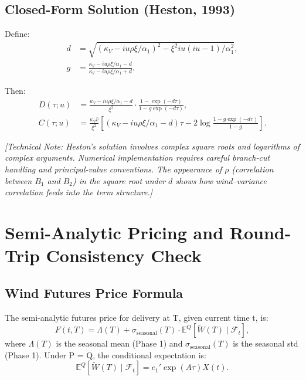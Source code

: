 \documentclass[11pt, a4paper, twoside]{article}
\begin{document}
\subsection{Closed-Form Solution (Heston, 1993)}

Define:
\begin{align}
d &= \sqrt{(\kappa_V - i u \rho \xi / \alpha_1)^2 - \xi^2 i u (i u - 1) / \alpha_1^2}, \\
g &= \frac{\kappa_V - i u \rho \xi / \alpha_1 - d}{\kappa_V - i u \rho \xi / \alpha_1 + d}.
\end{align}

Then:
\begin{align}
D(\tau; u) &= \frac{\kappa_V - i u \rho \xi / \alpha_1 - d}{\xi^2} \cdot \frac{1 - \exp(-d \tau)}{1 - g \exp(-d \tau)}, \\
C(\tau; u) &= \frac{\kappa_V \bar{v}}{\xi^2} \left[ (\kappa_V - i u \rho \xi / \alpha_1 - d) \tau - 2 \log \frac{1 - g \exp(-d \tau)}{1 - g} \right].
\end{align}

\textit{[Technical Note: Heston's solution involves complex square roots and logarithms of complex arguments. Numerical implementation requires careful branch-cut handling and principal-value conventions. The appearance of $\rho$ (correlation between $B_1$ and $B_2$) in the square root under $d$ shows how wind--variance correlation feeds into the term structure.]}

\section{Semi-Analytic Pricing and Round-Trip Consistency Check}

\subsection{Wind Futures Price Formula}

The semi-analytic futures price for delivery at T, given current time t, is:
\begin{equation}
F(t, T) = \Lambda(T) + \sigma_{\text{seasonal}}(T) \cdot \mathbb{E}^Q[\tilde{W}(T) \mid \mathcal{F}_t],
\end{equation}
where $\Lambda(T)$ is the seasonal mean (Phase 1) and $\sigma_{\text{seasonal}}(T)$ is the seasonal std (Phase 1). Under P = Q, the conditional expectation is:
\begin{equation}
\mathbb{E}^Q[\tilde{W}(T) \mid \mathcal{F}_t] = e_1' \exp(A \tau) X(t).
\end{equation}
\end{document}
